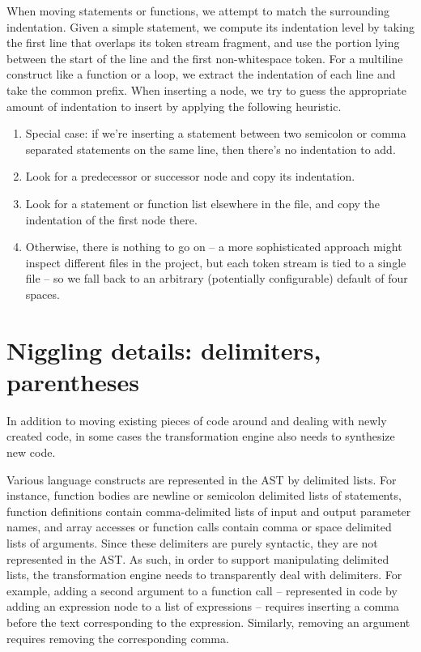 When moving statements or functions, we attempt to match the surrounding
indentation. Given a simple statement, we compute its indentation level by
taking the first line that overlaps its token stream fragment, and use the
portion lying between the start of the line and the first non-whitespace token.
For a multiline construct like a function or a loop, we extract the indentation
of each line and take the common prefix. When inserting a node, we try to guess
the appropriate amount of indentation to insert by applying the following
heuristic.

\begin{enumerate}
  \item Special case: if we're inserting a statement between two semicolon or
    comma separated statements on the same line, then there's no indentation to
    add.
  \item Look for a predecessor or successor node and copy its indentation.
  \item Look for a statement or function list elsewhere in the file, and copy
    the indentation of the first node there.
  \item Otherwise, there is nothing to go on -- a more sophisticated approach
    might inspect different files in the project, but each token stream is tied
    to a single file -- so we fall back to an arbitrary (potentially configurable)
    default of four spaces.
\end{enumerate}

\section{Niggling details: delimiters, parentheses}

In addition to moving existing pieces of code around and dealing with newly
created code, in some cases the transformation engine also needs to synthesize
new code.

Various \matlab language constructs are represented in the AST by delimited
lists. For instance, function bodies are newline or semicolon delimited lists
of statements, function definitions contain comma-delimited lists of input and
output parameter names, and array accesses or function calls contain comma or
space delimited lists of arguments. Since these delimiters are purely
syntactic, they are not represented in the AST. As such, in order to support
manipulating delimited lists, the transformation engine needs to transparently
deal with delimiters. For example, adding a second argument to a function call
-- represented in code by adding an expression node to a list of expressions --
requires inserting a comma before the text corresponding to the expression.
Similarly, removing an argument requires removing the corresponding comma.

